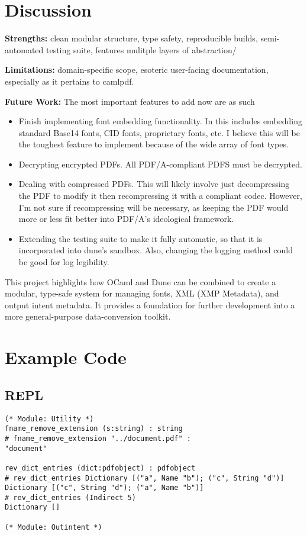 \documentclass[11pt]{article}
\begin{document}
\section*{Discussion}
\textbf{Strengths:} clean modular structure, type safety, reproducible builds, semi-automated testing suite, features mulitple layers of abstraction/  

\textbf{Limitations:} domain-specific scope, esoteric user-facing documentation, especially as it pertains to camlpdf.  

\textbf{Future Work:} The most important features to add now are as such
\begin{itemize}
  \item Finish implementing font embedding functionality. In this includes embedding standard Base14 fonts, CID fonts, proprietary fonts, etc. I believe this will be the toughest feature to implement because of the wide array of font types. 
  \item Decrypting encrypted PDFs. All PDF/A-compliant PDFS must be decrypted.
  \item Dealing with compressed PDFs. This will likely involve just decompressing the PDF to modify it then recompressing it with a compliant codec. However, I'm not sure if recompressing will be necessary, as keeping the PDF would more or less fit better into PDF/A's ideological framework.
  \item Extending the testing suite to make it fully automatic, so that it is incorporated into dune's sandbox. Also, changing the logging method could be good for log legibility. 
\end{itemize}
  

This project highlights how OCaml and Dune can be combined to create a modular, type-safe system for managing fonts, XML (XMP Metadata), and output intent metadata. It provides a foundation for further development into a more general-purpose data-conversion toolkit.

\section*{Example Code}
\subsection*{REPL}
\begin{verbatim}
(* Module: Utility *)
fname_remove_extension (s:string) : string
# fname_remove_extension "../document.pdf" : 
"document"

rev_dict_entries (dict:pdfobject) : pdfobject
# rev_dict_entries Dictionary [("a", Name "b"); ("c", String "d")]
Dictionary [("c", String "d"); ("a", Name "b")]
# rev_dict_entries (Indirect 5)
Dictionary []

(* Module: Outintent *)



\end{verbatim}
\end{document}
